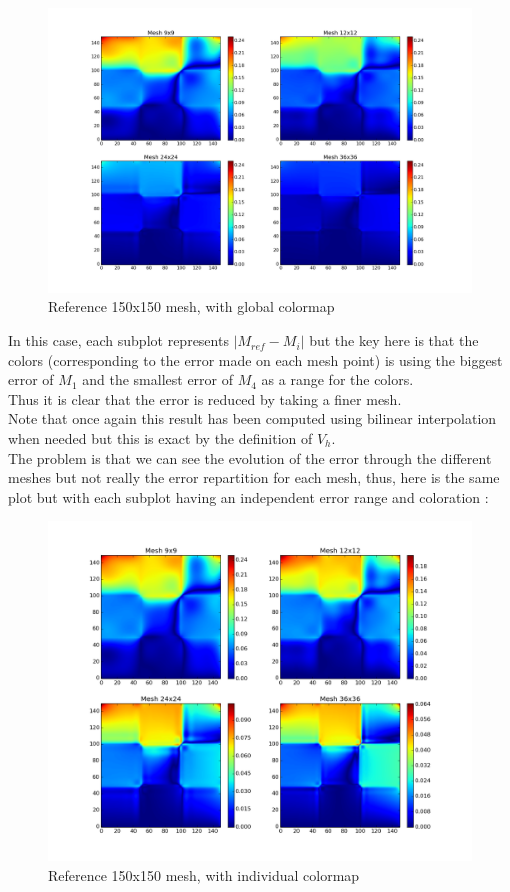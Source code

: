 \documentclass[a4paper]{report}
\begin{document}
\begin{figure}[H]
\begin{center}
\includegraphics[scale=0.37]{errorvsnorm.png}\caption{Reference 150x150 mesh, with global colormap}
\end{center}
\end{figure}
In this case, each subplot represents $|M_{ref}-M_i|$ but the key here is that the colors (corresponding to the error made on each mesh point) is using the biggest error of $M_1$ and the smallest error of $M_4$ as a range for the colors.\\
Thus it is clear that the error is reduced by taking a finer mesh.\\
Note that once again this result has been computed using bilinear interpolation when needed but this is exact by the definition of $V_h$.
\\
The problem is that we can see the evolution of the error through the different meshes but not really the error repartition for each mesh, thus, here is the same plot but with each subplot having an independent error range and coloration :
\begin{figure}[H]
\begin{center}
\includegraphics[scale=0.42]{errorvs.png}\caption{Reference 150x150 mesh, with individual colormap}
\end{center}
\end{figure}
\end{document}
